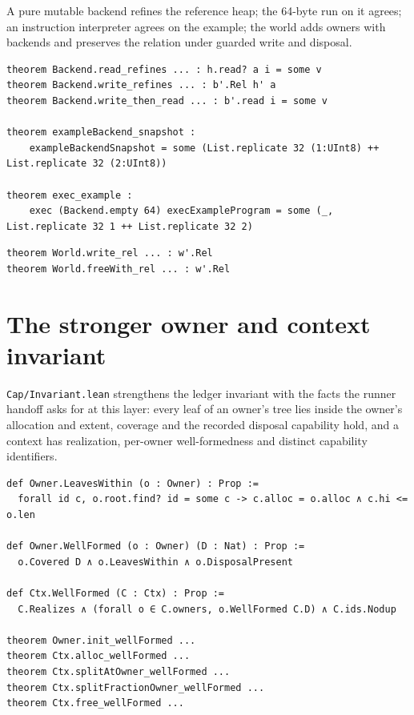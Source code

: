 \documentclass[10pt,a4paper]{article}
\newcommand{\file}[1]{\texttt{\small #1}}
\begin{document}
A pure mutable backend refines the reference heap; the 64-byte run on it agrees;
an instruction interpreter agrees on the example; the world adds owners with
backends and preserves the relation under guarded write and disposal.

\begin{lstlisting}[caption={\file{Cap/Backend.lean}, \file{Cap/BackendRun.lean}, \file{Cap/Exec.lean}.}]
theorem Backend.read_refines ... : h.read? a i = some v
theorem Backend.write_refines ... : b'.Rel h' a
theorem Backend.write_then_read ... : b'.read i = some v

theorem exampleBackend_snapshot :
    exampleBackendSnapshot = some (List.replicate 32 (1:UInt8) ++ List.replicate 32 (2:UInt8))

theorem exec_example :
    exec (Backend.empty 64) execExampleProgram = some (_, List.replicate 32 1 ++ List.replicate 32 2)
\end{lstlisting}

\begin{lstlisting}[caption={\file{Cap/World.lean}.}]
theorem World.write_rel ... : w'.Rel
theorem World.freeWith_rel ... : w'.Rel
\end{lstlisting}

\section{The stronger owner and context invariant}

\file{Cap/Invariant.lean} strengthens the ledger invariant with the facts the
runner handoff asks for at this layer: every leaf of an owner's tree lies inside
the owner's allocation and extent, coverage and the recorded disposal capability
hold, and a context has realization, per-owner well-formedness and distinct
capability identifiers.

\begin{lstlisting}[caption={\file{Cap/Invariant.lean}.}]
def Owner.LeavesWithin (o : Owner) : Prop :=
  forall id c, o.root.find? id = some c -> c.alloc = o.alloc ∧ c.hi <= o.len

def Owner.WellFormed (o : Owner) (D : Nat) : Prop :=
  o.Covered D ∧ o.LeavesWithin ∧ o.DisposalPresent

def Ctx.WellFormed (C : Ctx) : Prop :=
  C.Realizes ∧ (forall o ∈ C.owners, o.WellFormed C.D) ∧ C.ids.Nodup

theorem Owner.init_wellFormed ...
theorem Ctx.alloc_wellFormed ...
theorem Ctx.splitAtOwner_wellFormed ...
theorem Ctx.splitFractionOwner_wellFormed ...
theorem Ctx.free_wellFormed ...
\end{lstlisting}
\end{document}

